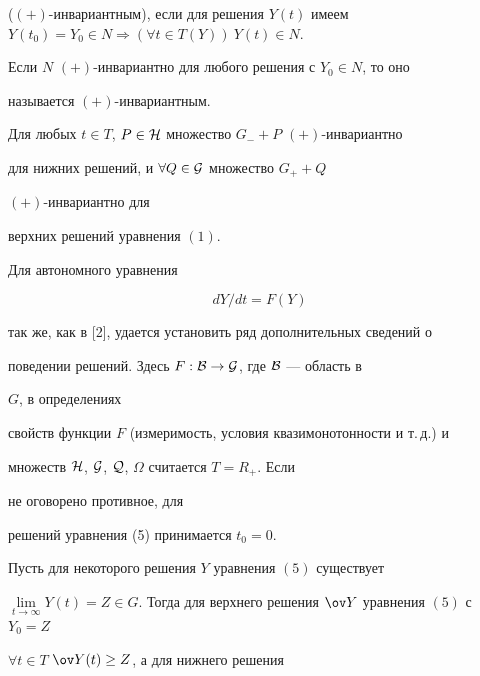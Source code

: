 {($(+)$-инвариантным), если для решения $Y(t)$ имеем $Y(t_0)=Y_0\in 


N\Rightarrow(\forall t\in T(Y))\ Y(t)\in N$. 


Если $N$\; $(+)$-инвариантно для любого решения с $Y_0\in N$, то оно 


называется $(+)$-инвариантным. 


 


\begin{lem} 


Для любых $t\in T$, $P\in\cal H$ множество $G_-+P$\; $(+)$-инвариантно 


для нижних решений, и $\forall Q\in\cal G$ множество $G_++Q$\; 


$(+)$-инвариантно для 


верхних решений уравнения $(1)$. 


\end{lem} 


 


Для автономного уравнения 


\begin{equation} 


d Y/d t=F(Y) 


\end{equation} 


так же, как в [2], удается установить ряд дополнительных сведений о 


поведении решений. Здесь $F:\cal B\to G$, где $\cal B$ --- область в 


$G$, в определениях 


свойств функции $F$ (измеримость, условия квазимонотонности и т.\,д.) и 


множеств $\cal H$, $\cal G$, $\cal Q$, $\Omega$ считается $T=R_+$. Если 


не оговорено противное, для 


решений уравнения (5) принимается $t_0=0$. 


 


\begin{lem} 


Пусть для некоторого решения $Y$ уравнения $(5)$ существует 


$\lim\limits_{t\to\infty}Y(t)=Z\in G$. Тогда для верхнего решения $\ov 


Y$ уравнения $(5)$ с $Y_0=Z$ 


$\forall t\in T$\; $\ov Y(t)\ge Z$, а для нижнего решения 



\end{lem}}
